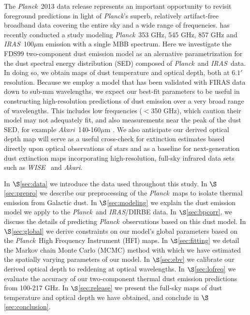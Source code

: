 \documentclass{emulateapj}
\newcommand{\IRAS}{{\it IRAS}}
\newcommand{\PLANCK}{{\it Planck}}
\newcommand{\AKARI}{{\it Akari}}
\newcommand{\WISE}{{\it WISE}}
\begin{document}
The \PLANCK~2013 data release \citep{planck2013} represents an important 
opportunity to revisit foreground predictions in light of \PLANCK's superb, 
relatively artifact-free broadband data covering the entire sky and a wide 
range of frequencies. \cite{planckdust} has recently conducted a study modeling
\PLANCK~353 GHz, 545 GHz, 857 GHz and \IRAS~100$\mu$m emission with a single
MBB spectrum. Here we investigate the FDS99 two-component dust emission model 
as an alernative parametrization for the dust spectral energy distribution 
(SED) composed  of \PLANCK~and \IRAS~data. In doing so, we obtain maps of dust 
temperature and optical depth, both at $6.1'$ resolution. Because we employ a 
model that has been validated with FIRAS data down to sub-mm wavelengths, we 
expect our best-fit parameters to be useful in constructing high-resolution 
predictions of dust emission over a very broad range of wavelengths. This 
includes low frequencies ($<$350 GHz), which \cite{planckdust} caution their 
model may not adequately fit, and also measurements near the peak of the dust 
SED, for example \AKARI~140-160$\mu$m \citep{akari}. We also anticipate our 
derived optical depth map will serve as a useful cross-check for extinction 
estimates based directly upon optical observations of stars
\citep[e.g.][]{schlafly14} and as a baseline for next-generation dust 
extinction maps incorporating high-resolution, full-sky infrared data sets such
as \WISE~\citep{wright10, meisner14} and \AKARI.

In $\S$\ref{sec:data} we introduce the data used throughout this study. In 
$\S$\ref{sec:prepro} we describe our preprocessing of the \PLANCK~maps to 
isolate thermal emission from Galactic dust. In $\S$\ref{sec:modeling} we 
explain the dust emission model we apply to the \PLANCK~and \IRAS/DIRBE data. 
In $\S$\ref{sec:bpcorr}, we discuss the details of predicting 
\PLANCK~observations based on this dust model. In $\S$\ref{sec:global} we 
derive constraints on our model's global parameters based on the \PLANCK~High 
Frequency Instrument (HFI) maps. In $\S$\ref{sec:fitting} we detail the Markov 
chain Monte Carlo (MCMC) method with which we have estimated the spatially 
varying parameters of our model. In $\S$\ref{sec:ebv} we calibrate our derived 
optical depth to reddening at optical wavelengths. In $\S$\ref{sec:lofreq} we
evaluate the accuracy of our two-component thermal dust emission predictions 
from 100-217 GHz. In $\S$\ref{sec:release} we present the full-sky maps of dust
temperature and optical depth we have obtained, and conclude in 
$\S$\ref{sec:conclusion}.
\end{document}
